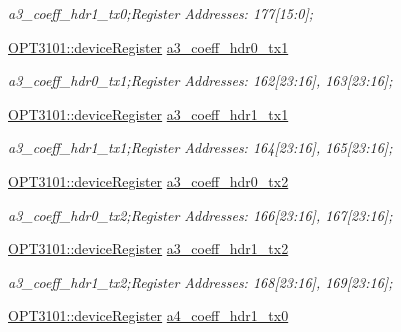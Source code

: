 \begin{DoxyCompactItemize}
\begin{DoxyCompactList}\small\item\em a3\+\_\+coeff\+\_\+hdr1\+\_\+tx0;Register Addresses\+: 177\mbox{[}15\+:0\mbox{]}; \end{DoxyCompactList}\item 
\mbox{\hyperlink{class_o_p_t3101_1_1device_register}{O\+P\+T3101\+::device\+Register}} \mbox{\hyperlink{class_o_p_t3101_1_1registers_a5064513c00e66a11d753f92993feada6}{a3\+\_\+coeff\+\_\+hdr0\+\_\+tx1}}
\begin{DoxyCompactList}\small\item\em a3\+\_\+coeff\+\_\+hdr0\+\_\+tx1;Register Addresses\+: 162\mbox{[}23\+:16\mbox{]}, 163\mbox{[}23\+:16\mbox{]}; \end{DoxyCompactList}\item 
\mbox{\hyperlink{class_o_p_t3101_1_1device_register}{O\+P\+T3101\+::device\+Register}} \mbox{\hyperlink{class_o_p_t3101_1_1registers_a41edd1d9914ee0b1d44f31e8d11839b0}{a3\+\_\+coeff\+\_\+hdr1\+\_\+tx1}}
\begin{DoxyCompactList}\small\item\em a3\+\_\+coeff\+\_\+hdr1\+\_\+tx1;Register Addresses\+: 164\mbox{[}23\+:16\mbox{]}, 165\mbox{[}23\+:16\mbox{]}; \end{DoxyCompactList}\item 
\mbox{\hyperlink{class_o_p_t3101_1_1device_register}{O\+P\+T3101\+::device\+Register}} \mbox{\hyperlink{class_o_p_t3101_1_1registers_ae18029c6c47acc178d77fa2e70d40a58}{a3\+\_\+coeff\+\_\+hdr0\+\_\+tx2}}
\begin{DoxyCompactList}\small\item\em a3\+\_\+coeff\+\_\+hdr0\+\_\+tx2;Register Addresses\+: 166\mbox{[}23\+:16\mbox{]}, 167\mbox{[}23\+:16\mbox{]}; \end{DoxyCompactList}\item 
\mbox{\hyperlink{class_o_p_t3101_1_1device_register}{O\+P\+T3101\+::device\+Register}} \mbox{\hyperlink{class_o_p_t3101_1_1registers_af4b788f16904aaeb7d0a4bf1cd6e6f4f}{a3\+\_\+coeff\+\_\+hdr1\+\_\+tx2}}
\begin{DoxyCompactList}\small\item\em a3\+\_\+coeff\+\_\+hdr1\+\_\+tx2;Register Addresses\+: 168\mbox{[}23\+:16\mbox{]}, 169\mbox{[}23\+:16\mbox{]}; \end{DoxyCompactList}\item 
\mbox{\hyperlink{class_o_p_t3101_1_1device_register}{O\+P\+T3101\+::device\+Register}} \mbox{\hyperlink{class_o_p_t3101_1_1registers_a8ca6cd189271ae5efde999e39da9fce3}{a4\+\_\+coeff\+\_\+hdr1\+\_\+tx0}}

\end{DoxyCompactItemize}
